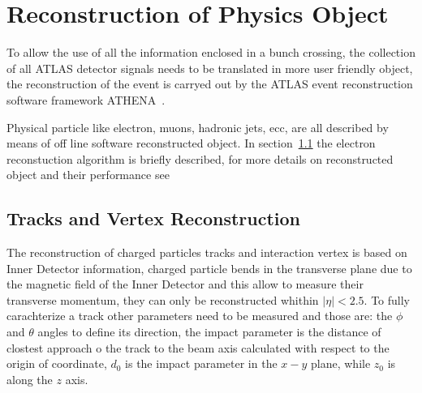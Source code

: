 \chapter{Reconstruction of Physics Object}\label{chap:obj}
\vspace{3cm}
To allow the use of all the information enclosed in a bunch crossing, the collection
of all ATLAS detector signals needs to be translated in more user friendly object, 
the reconstruction of the event is carryed out by the ATLAS event reconstruction 
software framework ATHENA~\cite{Athena}. 

Physical particle like electron, muons, hadronic jets, ecc, are all described by means 
of off line software reconstructed object. In section~\ref{} the electron reconstuction 
algorithm is briefly described,
for more details on reconstructed object and their performance see~\cite{AtlasCSCBook}

\clearpage

\section{Tracks and Vertex Reconstruction}
The reconstruction of charged particles tracks and interaction vertex is based on Inner Detector
information, charged particle bends in the transverse plane due to the magnetic field of the Inner Detector and
this allow to measure their transverse momentum, they can only be reconstructed whithin $|\eta| < 2.5$.
To fully carachterize a track other parameters need to be measured
and those are: the $\phi$ and $\theta$ angles to define its direction, the impact parameter is the 
distance of clostest approach o the track to the beam axis calculated with respect to the origin of coordinate, $d_0$ 
is the impact parameter in the $x-y$ plane,  while $z_0$  is along the $z$ axis.

